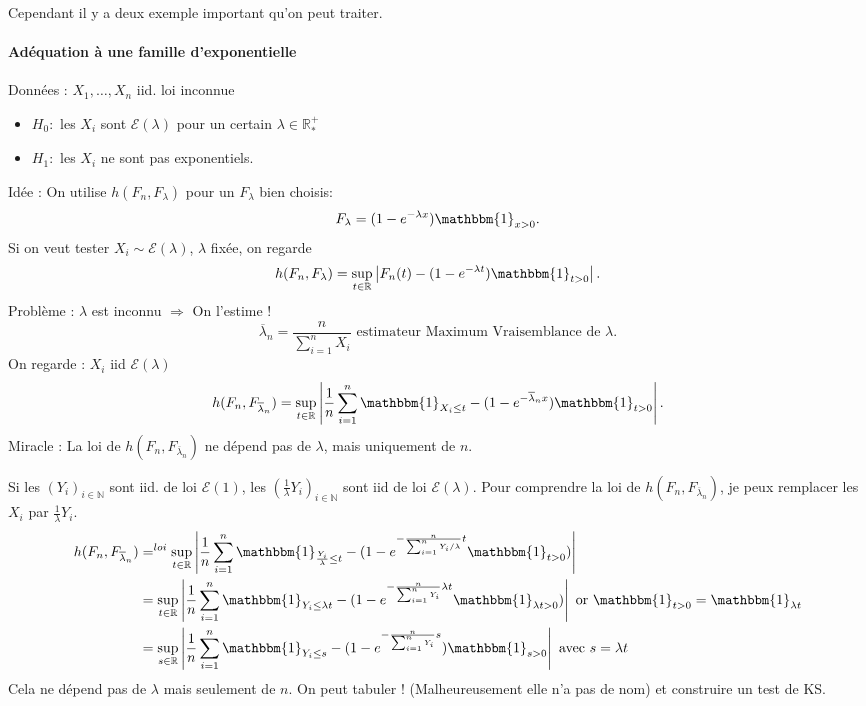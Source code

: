 \documentclass{article}
\theoremstyle{plain}%
\theoremstyle{definition}
\theoremstyle{remark}
\begin{document}
Cependant il y a deux exemple important qu'on peut traiter. 

\paragraph{Adéquation à une famille d'exponentielle}
Données : $ X_1, \dots, X_n $ iid. loi inconnue
\begin{itemize}
    \item $ H_0: $ les $ X_i $ sont $ \mathcal{E}(\lambda ) $ pour un certain $ \lambda \in \mathbb{R}^+_* $ 
    \item $ H_1: $ les $ X_i $ ne sont pas exponentiels.
\end{itemize}
Idée : On utilise $ h(F_n, F_\lambda ) $ pour un $ F_\lambda  $ bien choisis:
\[
    F_\lambda = (1-e^{-\lambda x})\mathbbm{1}_{x>0}
.\]
Si on veut tester $ X_i \sim \mathcal{E}(\lambda ) $, $ \lambda  $ fixée, on regarde 
\[
    h(F_n, F_\lambda ) = \sup _{t \in \mathbb{R}} \left| F_n(t) - (1 - e^{-\lambda t}) \mathbbm{1}_{t>0} \right| 
.\]
Problème : $ \lambda$ est inconnu $\Rightarrow  $ On l'estime !
\[
    \overline{\lambda }_n = \frac{n}{\sum_{i=1}^{n}X_i} \text{ estimateur Maximum Vraisemblance de }\lambda 
.\]
On regarde : $ X_i $ iid $ \mathcal{E}(\lambda ) $ 
\[
    h(F_n, F_{\overline{\lambda }_n }) = \sup _{t \in \mathbb{R}} \left| \frac{1}{n}\sum_{i=1}^{n} \mathbbm{1}_{X_i \leq t} - (1-e^{-\overline{\lambda}_n x})\mathbbm{1}_{t>0} \right| 
.\]
Miracle : La loi de $ h(F_n, F_{\overline{\lambda }_n}) $ ne dépend pas de $ \lambda  $, mais uniquement de $ n $. 

Si les $ (Y_i)_{i \in \mathbb{N}} $ sont iid. de loi $ \mathcal{E}(1) $, les $ (\frac{1}{\lambda } Y_i)_{i \in \mathbb{N}} $ sont iid de loi $ \mathcal{E}(\lambda ) $. Pour comprendre la loi de $ h(F_n, F_{\overline{\lambda }_n}) $, je peux remplacer les $ X_i $ par $ \frac{1}{\lambda }Y_i $.
\begin{align*}
    h(F_n, F_{\overline{\lambda }_n}) &= ^{loi} \sup _{t \in \mathbb{R}} \left| \frac{1}{n}\sum_{i=1}^{n}\mathbbm{1}_{\frac{Y_i}{\lambda } \leq t} - (1 - e^{- \frac{n}{\sum_{i=1}^{n} Y_i /\lambda } t }\mathbbm{1}_{t > 0}) \right|  \\
        &= \sup _{t \in \mathbb{R}} \left| \frac{1}{n}\sum_{i=1}^{n}\mathbbm{1}_{Y_i \leq  \lambda t} - (1 - e^{- \frac{n}{\sum_{i=1}^{n}Y_i} \lambda t }\mathbbm{1}_{\lambda  t > 0}) \right| \text{ or } \mathbbm{1}_{t>0} = \mathbbm{1}_{\lambda t} \\
        &= \sup _{s \in \mathbb{R}} \left| \frac{1}{n}\sum_{i=1}^{n}\mathbbm{1}_{Y_i \leq s} - (1-e^{- \frac{n}{\sum_{i=1}^{n}Y_i} s})\mathbbm{1}_{s>0} \right| \text{ avec } s=\lambda t
\end{align*}
Cela ne dépend pas de $ \lambda  $ mais seulement de $ n $. On peut tabuler ! (Malheureusement elle n'a pas de nom) et construire un test de KS.
\end{document}
